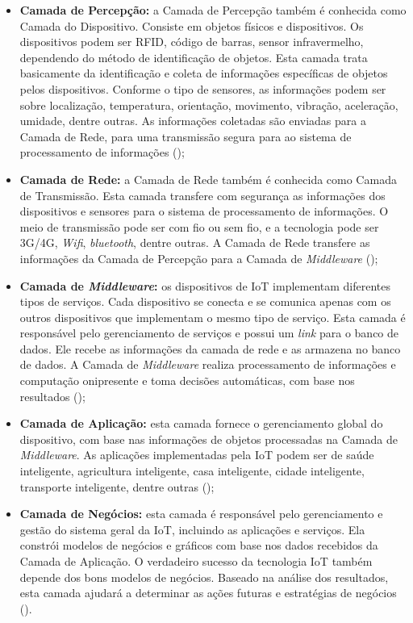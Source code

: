 \begin{itemize}
    \item \textbf{Camada de Percepção:} a Camada de Percepção também é conhecida como Camada do Dispositivo. Consiste em objetos físicos e dispositivos. Os dispositivos podem ser \acrshort{RFID}, código de barras, sensor infravermelho, dependendo do método de identificação de objetos. Esta camada trata basicamente da identificação e coleta de informações específicas de objetos pelos dispositivos. Conforme o tipo de sensores, as informações podem ser sobre localização, temperatura, orientação, movimento, vibração, aceleração, umidade, dentre outras. As informações coletadas são enviadas para a Camada de Rede, para uma transmissão segura para ao sistema de processamento de informações ();
    \item \textbf{Camada de Rede:} a Camada de Rede também é conhecida como Camada de Transmissão. Esta camada transfere com segurança as informações dos dispositivos e sensores para o sistema de processamento de informações. O meio de transmissão pode ser com fio ou sem fio, e a tecnologia pode ser 3G/4G, \textit{Wifi}, \textit{bluetooth}, dentre outras. A Camada de Rede transfere as informações da Camada de Percepção para a Camada de \textit{Middleware} ();
    \item \textbf{Camada de \textit{Middleware}:} os dispositivos de \acrshort{IoT} implementam diferentes tipos de serviços. Cada dispositivo se conecta e se comunica apenas com os outros dispositivos que implementam o mesmo tipo de serviço. Esta camada é responsável pelo gerenciamento de serviços e possui um \textit{link} para o banco de dados. Ele recebe as informações da camada de rede e as armazena no banco de dados. A Camada de \textit{Middleware} realiza processamento de informações e computação onipresente e toma decisões automáticas, com base nos resultados ();
    \item \textbf{Camada de Aplicação:} esta camada fornece o gerenciamento global do dispositivo, com base nas informações de objetos processadas na Camada de \textit{Middleware}. As aplicações implementadas pela IoT podem ser de saúde inteligente, agricultura inteligente, casa inteligente, cidade inteligente, transporte inteligente, dentre outras ();
    \item \textbf{Camada de Negócios:} esta camada é responsável pelo gerenciamento e gestão do sistema geral da \acrshort{IoT}, incluindo as aplicações e serviços. Ela constrói modelos de negócios e gráficos com base nos dados recebidos da Camada de Aplicação. O verdadeiro sucesso da tecnologia \acrshort{IoT} também depende dos bons modelos de negócios. Baseado na análise dos resultados, esta camada ajudará a determinar as ações futuras e estratégias de negócios ().
\end{itemize}

